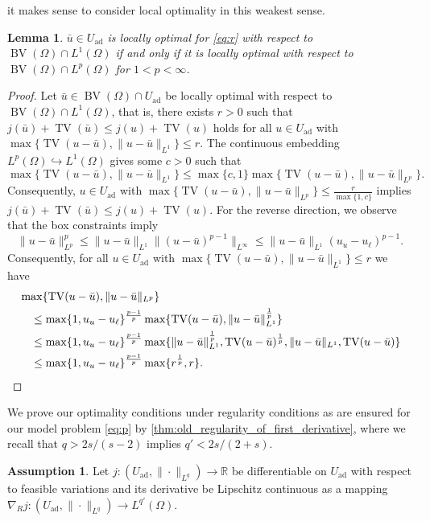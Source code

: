 \documentclass[11pt]{article}
\newcommand{\R}{\mathbb{R}}
\DeclareMathOperator*{\BV}{BV}
\DeclareMathOperator*{\TV}{TV}
\newcommand{\feas}{U_{\textrm{ad}}}
\newtheorem{lemma}[theorem]{Lemma}
\theoremstyle{definition}
\newtheorem{assumption}[theorem]{Assumption}
\theoremstyle{remark}
\begin{document}
it makes sense to consider local optimality in this weakest sense.
%
\begin{lemma}
$\bar{u} \in \feas$ is locally optimal for \eqref{eq:r}
with respect to $\BV(\Omega) \cap L^{1}(\Omega)$ if and only if it is locally
optimal with respect to $\BV(\Omega) \cap L^{p}(\Omega)$ for $1 < p < \infty$.
\end{lemma}
\begin{proof}
Let $\bar{u} \in \BV(\Omega) \cap \feas$ be locally optimal with respect to
$\BV(\Omega) \cap L^1(\Omega)$, that is, there exists $r > 0$ such that
$j(\bar{u}) + \TV(\bar{u}) \le j(u) + \TV(u)$ 
holds for all $u \in \feas$ with $\max\{\TV(u - \bar{u}), \|u - \bar{u}\|_{L^1}\} \le r$. 
The continuous embedding $L^p(\Omega) \hookrightarrow L^1(\Omega)$ gives some $c > 0$
such that
%
\[ \max\{\TV(u - \bar{u}),\|u - \bar{u}\|_{L^1}\}
   \le \max\{c,1\} \max\{\TV(u - \bar{u}),\|u - \bar{u}\|_{L^p}\}.
\]
%
Consequently, $u \in \feas$ with $\max\{\TV(u - \bar{u}),\|u - \bar{u}\|_{L^p}\} \le \frac{r}{\max\{1,c\}}$
implies $j(\bar{u}) + \TV(\bar{u}) \le j(u) + \TV(u)$.
For the reverse direction, we observe that the box constraints imply
%
\[ \|u - \bar{u}\|_{L^p}^p \le \|u - \bar{u}\|_{L^1}\|(u - \bar{u})^{p - 1}\|_{L^\infty}
   \le \|u - \bar{u}\|_{L^1}(u_u - u_\ell)^{p - 1}.
\]
%
Consequently, for all $u \in \feas$ with $\max\{\TV(u - \bar{u}),\|u - \bar{u}\|_{L^1}\} \le r$
we have
%
\begin{align*}
\hspace{1em}&\hspace{-1em} \max\{\TV(u - \bar{u}),\|u - \bar{u}\|_{L^p}\}\\
&\le 
\max\{1,u_u - u_\ell\}^{\frac{p - 1}{p}}\max\{\TV(u - \bar{u}),\|u - \bar{u}\|_{L^1}^\frac{1}{p}\} \\
&\le \max\{1,u_u - u_\ell\}^{\frac{p - 1}{p}}\max\{\|u - \bar{u}\|_{L^1}^\frac{1}{p},\TV(u - \bar{u})^\frac{1}{p},
                                         \|u - \bar{u}\|_{L^1},\TV(u - \bar{u})\}\\
&\le \max\{1,u_u - u_\ell\}^{\frac{p - 1}{p}}\max\{r^{\frac{1}{p}},r\}.
\end{align*}
\end{proof}
%
We prove our optimality conditions under regularity conditions as are ensured
for our model problem \eqref{eq:p} by \cref{thm:old_regularity_of_first_derivative},
where we recall that $q > 2s/(s - 2)$ implies $q' < 2s/(2 + s)$.
%
\begin{assumption}\label{ass:j}
Let $j : (\feas, \|\cdot\|_{L^q}) \to \R$ be differentiable on $\feas$
with respect to feasible variations and its derivative be Lipschitz continuous
as a mapping $\nabla_R j : (\feas, \|\cdot\|_{L^q}) \to L^{q'}(\Omega)$.
\end{assumption}
\end{document}
